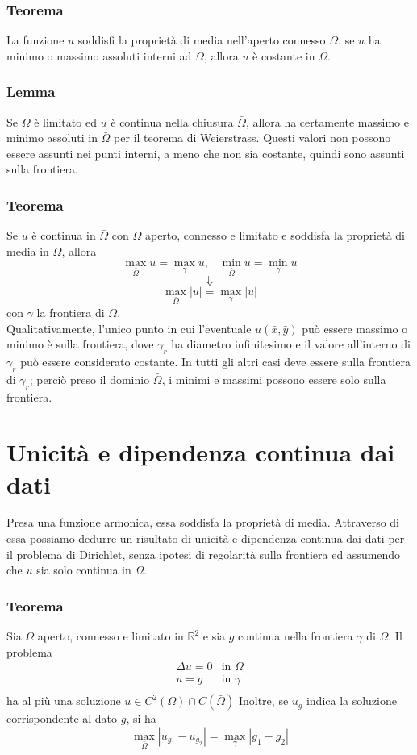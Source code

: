 \subsubsection{Teorema}
La funzione $u$ soddisfi la propriet\`a di media nell'aperto connesso $\Omega$.
se $u$ ha minimo o massimo assoluti interni ad $\Omega$, allora $u$ \`e costante
in $\Omega$.
\subsubsection{Lemma}
Se $\Omega$ \`e limitato ed $u$ \`e continua nella chiusura $\bar{\Omega}$,
allora ha certamente massimo e minimo assoluti in $\bar{\Omega}$ per il
teorema di Weierstrass. Questi valori non possono essere assunti nei punti
interni, a meno che non sia costante, quindi sono assunti sulla frontiera.

\subsubsection{Teorema}
Se $u$ \`e continua in $\bar{\Omega}$ con $\Omega$ aperto, connesso e limitato
e soddisfa la propriet\`a di media in $\Omega$, allora
\[
	\max_{\bar{\Omega}} u= \max_{\gamma} u, \;\;\;
	\min_{\bar{\Omega}} u= \min_{\gamma} u
\]
\[
	\Downarrow
\]
\[
	\max_{\bar{\Omega}} |u|= \max_{\gamma} |u|
\]
con $\gamma$ la frontiera di $\Omega$.\\
Qualitativamente, l'unico punto in cui l'eventuale $u(\bar{x}, \bar{y})$ pu\`o
essere massimo o minimo \`e sulla frontiera, dove $\gamma_r$ ha diametro
infinitesimo e il valore all'interno di $\gamma_r$ pu\`o essere considerato
costante. In tutti gli altri casi deve essere sulla frontiera di $\gamma_r$;
perci\`o preso il dominio $\bar{\Omega}$, i minimi e massimi possono essere solo
sulla frontiera.
\section{Unicit\`a e dipendenza continua dai dati}
Presa una funzione armonica, essa soddisfa la propriet\`a di media.
Attraverso di essa possiamo dedurre un risultato di unicit\`a e dipendenza
continua dai dati per il problema di Dirichlet, senza ipotesi di regolarit\`a
sulla frontiera ed assumendo che $u$ sia solo continua in $\bar{\Omega}$.
\subsubsection{Teorema}
Sia $\Omega$ aperto, connesso e limitato in $\mathbb{R}^2$ e sia $g$ continua
nella frontiera $\gamma$ di $\Omega$.
Il problema
\[
	\begin{array}{ll}
		\Delta u= 0 & \text{in }\Omega \\
		u= g & \text{in }\gamma \\
	\end{array}
\]
ha al pi\`u una soluzione $u \in C^2 (\Omega) \cap C(\bar{\Omega})$
Inoltre, se $u_g$ indica la soluzione corrispondente al dato $g$, si ha
\[
	\max_{\bar{\Omega}} \left| u_{g_1} - u_{g_2} \right|=
	\max_{\gamma} \left| g_1 - g_2 \right|
\]
